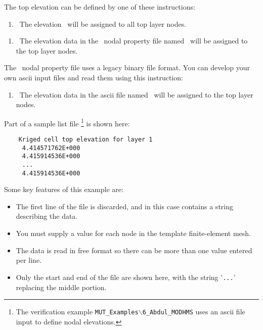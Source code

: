  The top elevation can be defined by one of these instructions: \label{'Page:TopElev'}

    {\squish
    \begin{enumerate}
    \item {}\  The elevation \ will be assigned to all top layer nodes.
    \end{enumerate}
    \squish
    }

    {\squish
    \begin{enumerate}
    \item {}\  The elevation data in the \gb\ nodal property file named \ will be assigned to the top layer nodes.
    \end{enumerate}
    \squish
    }

The \gb\ nodal property file uses a legacy binary file format. You can develop your own ascii input files and read them using this instruction:

    {\squish
    \begin{enumerate}
    \item {}\  The elevation data in the ascii file named  \ will be assigned to the top layer nodes.
    \end{enumerate}
    \squish
    }

Part of a sample list file \footnote{The verification example \texttt{MUT\_Examples$\backslash$6\_Abdul\_MODHMS} uses an ascii file input to define nodal elevations.} is shown here:
    \begin{verbatim}
    Kriged cell top elevation for layer 1
     4.414571762E+000
     4.415914536E+000
     ...
     4.415914536E+000
     \end{verbatim}
     \squish
Some key features of this example are:
\begin{itemize}
  \item The first line of the file is discarded, and in this case contains a string describing the data.
  \item You must supply a value for each node in the template finite-element mesh.
  \item The data is read in free format so there can be more than one value entered per line.
  \item Only the start and end of the file are shown here, with the string '\texttt{...}' replacing the middle portion.
\end{itemize}

